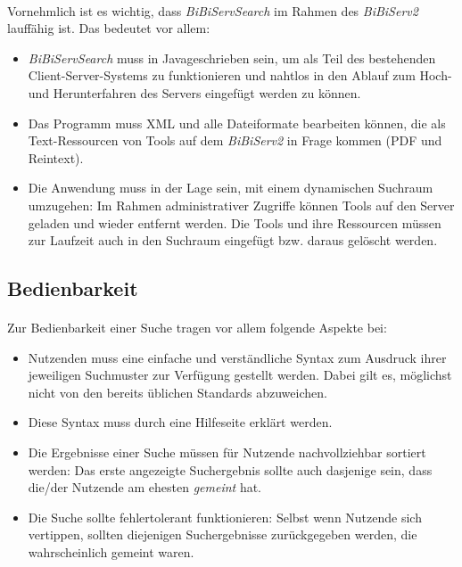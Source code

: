 \paragraph{} Vornehmlich ist es wichtig, dass \textit{BiBiServSearch} im Rahmen des \textit{BiBiServ2} lauffähig ist. Das bedeutet vor allem:
\begin{itemize}
 \item \textit{BiBiServSearch} muss in Java\texttrademark geschrieben sein, um als Teil des bestehenden Client-Server-Systems zu funktionieren und nahtlos in den Ablauf zum Hoch- und Herunterfahren des Servers eingefügt werden zu können.
 \item Das Programm muss XML und alle Dateiformate bearbeiten können, die als Text-Ressourcen von Tools auf dem \textit{BiBiServ2} in Frage kommen (PDF und Reintext).
 \item Die Anwendung muss in der Lage sein, mit einem dynamischen Suchraum umzugehen: Im Rahmen administrativer Zugriffe können Tools auf den Server geladen und wieder entfernt werden. Die Tools und ihre Ressourcen müssen zur Laufzeit auch in den Suchraum eingefügt bzw. daraus gelöscht werden.
\end{itemize}

\subsection{Bedienbarkeit}

\paragraph{} Zur Bedienbarkeit einer Suche tragen vor allem folgende Aspekte bei:
\begin{itemize}
 \item Nutzenden muss eine einfache und verständliche Syntax zum Ausdruck ihrer jeweiligen Suchmuster zur Verfügung gestellt werden. Dabei gilt es, möglichst nicht von den bereits üblichen Standards abzuweichen.
 \item Diese Syntax muss durch eine Hilfeseite erklärt werden.
 \item Die Ergebnisse einer Suche müssen für Nutzende nachvollziehbar sortiert werden: Das erste angezeigte Suchergebnis sollte auch dasjenige sein, dass die/der Nutzende am ehesten \textit{gemeint} hat.
 \item Die Suche sollte fehlertolerant funktionieren: Selbst wenn Nutzende sich vertippen, sollten diejenigen Suchergebnisse zurückgegeben werden, die wahrscheinlich gemeint waren.
\end{itemize}

